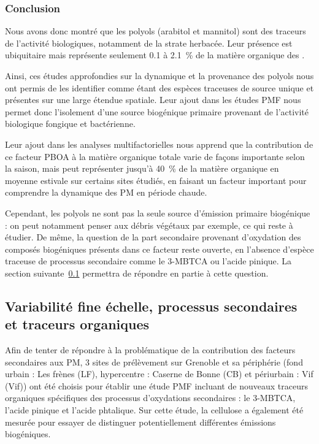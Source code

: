 \subsubsection{Conclusion}%
\label{ssub:conclusion_polyols}

Nous avons donc montré que les polyols (arabitol et mannitol) sont des traceurs de
l'activité biologiques, notamment de la strate herbacée. Leur présence est ubiquitaire
mais représente seulement 0.1 à \SI{2.1}{\percent} de la matière organique des \PMdix.

Ainsi, ces études approfondies sur la dynamique et la provenance des polyols nous ont
permis de les identifier comme étant des espèces traceuses de source unique et présentes
sur une large étendue spatiale. Leur ajout dans les études PMF nous permet donc
l'isolement d'une source biogénique primaire provenant de l'activité biologique fongique
et bactérienne.

Leur ajout dans les analyses multifactorielles nous apprend que la contribution de ce
facteur PBOA à la matière organique totale varie de façons importante selon la saison,
mais peut représenter jusqu'à \SI{40}{\percent} de la matière organique en moyenne
estivale sur certains sites étudiés, en faisant un facteur important pour comprendre la
dynamique des PM en période chaude.

Cependant, les polyols ne sont pas la seule source d'émission primaire biogénique : on
peut notamment penser aux débris végétaux par exemple, ce qui reste à étudier. De même,
la question de la part secondaire provenant d'oxydation des composés biogéniques présents
dans ce facteur reste ouverte, en l'absence d'espèce traceuse de processus secondaire
comme le 3-MBTCA ou l'acide pinique. La section suivante~\ref{sub:processus_secondaires}
permettra de répondre en partie à cette question.

\subsection{Variabilité fine échelle, processus secondaires et traceurs organiques}%
\label{sub:processus_secondaires}

Afin de tenter de répondre à la problématique de la contribution des facteurs secondaires
aux PM, 3 sites de prélèvement sur Grenoble et sa périphérie (fond urbain : Les frènes
(LF), hypercentre : Caserne de Bonne (CB) et périurbain : Vif (Vif)) ont été choisis pour
établir une étude PMF incluant de nouveaux traceurs organiques spécifiques des processus
d'oxydations secondaires : le 3-MBTCA, l'acide pinique et l'acide phtalique. Sur cette
étude, la cellulose a également été mesurée pour essayer de distinguer potentiellement
différentes émissions biogéniques.

